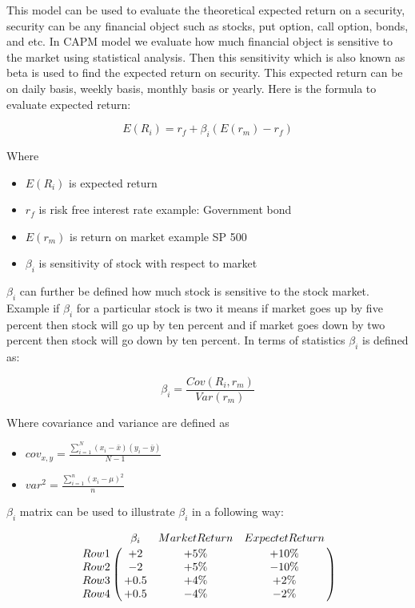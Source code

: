 This model can be used to evaluate the theoretical expected return on a security, security can be any financial object such as stocks, put option, call option, bonds, and etc. 
In CAPM model we evaluate how much financial object is sensitive to the market using statistical analysis. Then this sensitivity which is also known as beta is used
to find the expected return on security. This expected return can be on daily basis, weekly basis, monthly basis or yearly. Here is the formula to evaluate expected return:


$$E(R_{i}) = r_{f} + \beta_{i}(E(r_{m}) - r_{f})$$

\indent
Where
\indent 

 
\begin{itemize} 
\item $E(R_{i})$ is expected return 
\item $r_{f}$ is risk free interest rate example: Government bond
\item $E(r_{m})$ is return on market example SP 500
\item $\beta_{i}$ is sensitivity of stock with respect to market  
\end{itemize}


$\beta_{i}$ can further be defined how much stock is sensitive to the stock market. Example if $\beta_{i}$  for a particular stock is two it means if market goes up by five percent then stock will go up by ten percent and if market goes down by two percent then stock will go down by ten percent. In terms of statistics $\beta_{i}$  is defined as:

$$\beta_{i}  = \frac{Cov(R_{i},r_{m})}{Var(r_{m})}$$

\indent
Where covariance and variance are defined as
\indent

\begin{itemize} 
\item $cov_{x,y}=\frac{\sum_{i=1}^{N}(x_{i}-\bar{x})(y_{i}-\bar{y})}{N-1}$

\item $var^2 = \frac{\displaystyle\sum_{i=1}^{n}(x_i - \mu)^2} {n}$
\end{itemize}

\indent 
$\beta_{i}$ matrix can be used to illustrate $\beta_{i}$ in a following way:

$$\bordermatrix{\text{}&\beta_{i} &Market Return  &Expectet Return\cr
                Row 1& +2   &  +5 \%  &  +10 \%\cr
                Row 2& -2   &  +5 \%  &  -10 \%\cr
                Row 3& +0.5 &  +4 \%  &  +2  \%\cr
                Row 4& +0.5 &  -4 \%  &  -2  \%}$$

